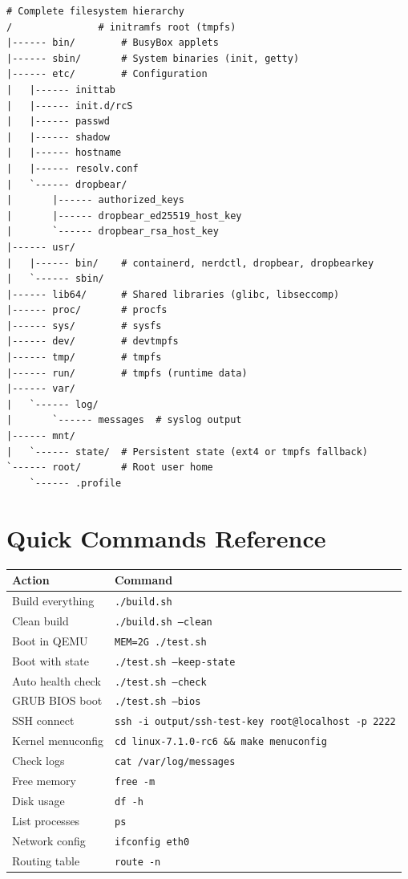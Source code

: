 \begin{lstlisting}
# Complete filesystem hierarchy
/               # initramfs root (tmpfs)
|------ bin/        # BusyBox applets
|------ sbin/       # System binaries (init, getty)
|------ etc/        # Configuration
|   |------ inittab
|   |------ init.d/rcS
|   |------ passwd
|   |------ shadow
|   |------ hostname
|   |------ resolv.conf
|   `------ dropbear/
|       |------ authorized_keys
|       |------ dropbear_ed25519_host_key
|       `------ dropbear_rsa_host_key
|------ usr/
|   |------ bin/    # containerd, nerdctl, dropbear, dropbearkey
|   `------ sbin/
|------ lib64/      # Shared libraries (glibc, libseccomp)
|------ proc/       # procfs
|------ sys/        # sysfs
|------ dev/        # devtmpfs
|------ tmp/        # tmpfs
|------ run/        # tmpfs (runtime data)
|------ var/
|   `------ log/
|       `------ messages  # syslog output
|------ mnt/
|   `------ state/  # Persistent state (ext4 or tmpfs fallback)
`------ root/       # Root user home
    `------ .profile
\end{lstlisting}

\section{Quick Commands Reference}

\begin{longtable}{|p{5cm}|p{8cm}|}
\hline
\textbf{Action} & \textbf{Command} \\
\hline
Build everything & \texttt{./build.sh} \\
Clean build & \texttt{./build.sh --clean} \\
Boot in QEMU & \texttt{MEM=2G ./test.sh} \\
Boot with state & \texttt{./test.sh --keep-state} \\
Auto health check & \texttt{./test.sh --check} \\
GRUB BIOS boot & \texttt{./test.sh --bios} \\
SSH connect & \texttt{ssh -i output/ssh-test-key root@localhost -p 2222} \\
Kernel menuconfig & \texttt{cd linux-7.1.0-rc6 \&\& make menuconfig} \\
Check logs & \texttt{cat /var/log/messages} \\
Free memory & \texttt{free -m} \\
Disk usage & \texttt{df -h} \\
List processes & \texttt{ps} \\
Network config & \texttt{ifconfig eth0} \\
Routing table & \texttt{route -n} \\
\hline
\end{longtable}
